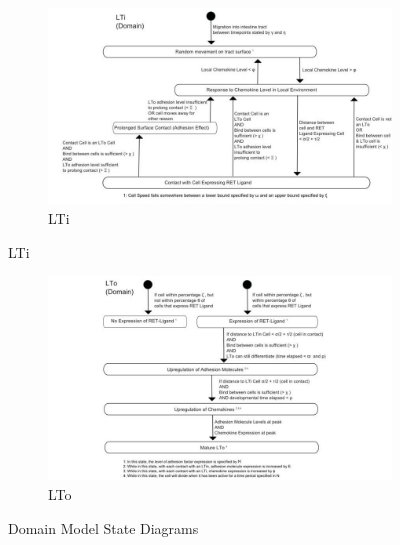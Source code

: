 \documentclass{UoYCSproject}
\begin{document}
\begin{figure}[htp]\ContinuedFloat
\centering
\begin{subfigure}{0.95\textwidth}
\centering
\includegraphics[width=\textwidth]{Appendix/Models/Domain/LTi}
\caption{LTi}
\end{subfigure}
\end{figure}

\begin{figure}[htp]\ContinuedFloat
\centering
\begin{subfigure}{0.95\textwidth}
\centering
\includegraphics[width=\textwidth]{Appendix/Models/Domain/LTo}
\caption{LTo}
\end{subfigure}

\caption{Domain Model State Diagrams\cite{kieran_thesis, kieran_methodology}}
\label{fig:domain_state_diagrams}
\end{figure}
\end{document}
